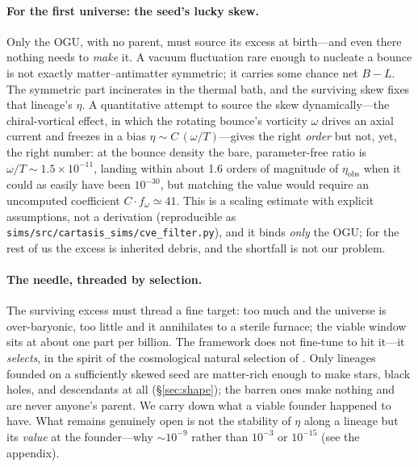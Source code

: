 \paragraph{For the first universe: the seed's lucky skew.} Only the OGU, with no
parent, must source its excess at birth---and even there nothing needs to
\emph{make} it. A vacuum fluctuation rare enough to nucleate a bounce is not
exactly matter--antimatter symmetric; it carries some chance net $B-L$. The
symmetric part incinerates in the thermal bath, and the surviving skew fixes that
lineage's $\eta$. A quantitative attempt to source the skew dynamically---the
chiral-vortical effect, in which the rotating bounce's vorticity $\omega$ drives an
axial current and freezes in a bias $\eta\sim C\,(\omega/T)$---gives the right
\emph{order} but not, yet, the right number: at the bounce density the bare,
parameter-free ratio is $\omega/T\sim1.5\times10^{-11}$, landing within about 1.6
orders of magnitude of $\eta_{\mathrm{obs}}$ when it could as easily have been
$10^{-30}$, but matching the value would require an uncomputed coefficient
$C\!\cdot\!f_\omega\simeq41$. This is a scaling estimate with explicit
assumptions, not a derivation (reproducible as
\texttt{sims/src/cartasis\_sims/cve\_filter.py}), and it binds \emph{only} the
OGU; for the rest of us the excess is inherited debris, and the shortfall is not
our problem.

\paragraph{The needle, threaded by selection.} The surviving excess must thread a
fine target: too much and the universe is over-baryonic, too little and it
annihilates to a sterile furnace; the viable window sits at about one part per
billion. The framework does not fine-tune to hit it---it \emph{selects}, in the spirit of
the cosmological natural selection of \citet{smolin1997}. Only
lineages founded on a sufficiently skewed seed are matter-rich enough to make
stars, black holes, and descendants at all (\S\ref{sec:shape}); the barren ones
make nothing and are never anyone's parent. We carry down what a viable founder
happened to have. What remains genuinely open is not the stability of $\eta$ along
a lineage but its \emph{value} at the founder---why $\sim10^{-9}$ rather than
$10^{-3}$ or $10^{-15}$ (see the appendix).

